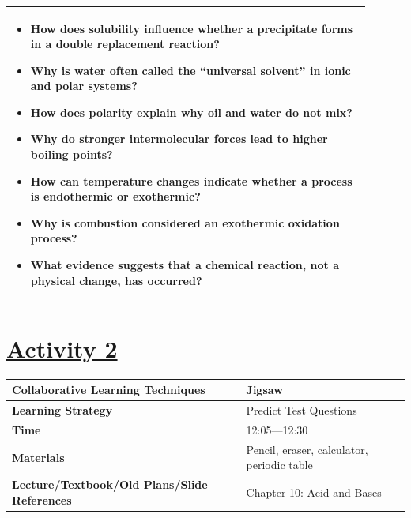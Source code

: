 \documentclass{article}
\begin{document}
\begin{tabular}{|p{0.9\linewidth}|}
\begin{itemize}
\item How does solubility influence whether a precipitate forms in a double replacement reaction?
\item Why is water often called the “universal solvent” in ionic and polar systems?
\item How does polarity explain why oil and water do not mix?
\item Why do stronger intermolecular forces lead to higher boiling points?
\item How can temperature changes indicate whether a process is endothermic or exothermic?
\item Why is combustion considered an exothermic oxidation process?
\item What evidence suggests that a chemical reaction, not a physical change, has occurred?
\end{itemize}\\
\hline
\end{tabular}


\newpage

\section*{\underline{Activity 2}}
\vspace{0.2cm}
\begin{tabular}{|p{4.2cm}|p{9.8cm}|}
\hline
\textbf{Collaborative Learning Techniques} & Jigsaw\\
\hline
\textbf{Learning Strategy} & Predict Test Questions \\
\hline
\textbf{Time} & 12:05---12:30\\
\hline
\textbf{Materials} & Pencil, eraser, calculator, periodic table \\
\hline
\textbf{Lecture/Textbook/Old Plans/Slide References} & Chapter 10: Acid and Bases \\
\hline
\end{tabular}
\vspace{0.5cm}
\end{document}
